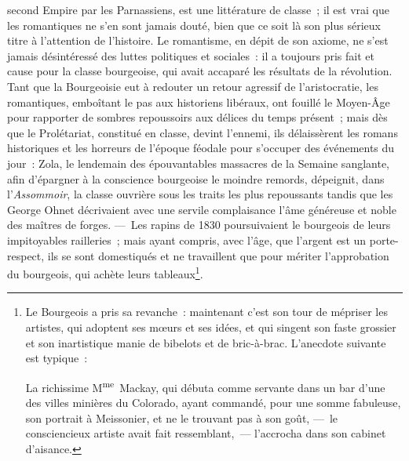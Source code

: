 \documentclass[french,twoside]{book} %
\begin{document}
\label{p605}second Empire par les Parnassiens, est une littérature de classe ; il est vrai que les romantiques ne s’en sont jamais douté, bien que ce soit là son plus sérieux titre à l’attention de l’histoire. Le romantisme, en dépit de son axiome, ne s’est jamais désintéressé des luttes politiques et sociales : il a toujours pris fait et cause pour la classe bourgeoise, qui avait accaparé les résultats de la révolution. Tant que la Bourgeoisie eut à redouter un retour agressif de l’aristocratie, les romantiques, emboîtant le pas aux historiens libéraux, ont fouillé le Moyen-Âge pour rapporter de sombres repoussoirs aux délices du temps présent ; mais dès que le Prolétariat, constitué en classe, devint l’ennemi, ils délaissèrent les romans historiques et les horreurs de l’époque féodale pour s’occuper des événements du jour : Zola, le lendemain des épouvantables massacres de la Semaine sanglante, afin d’épargner à la conscience bourgeoise le moindre remords, dépeignit, dans l’\emph{Assommoir}, la classe ouvrière sous les traits les plus repoussants tandis que les George Ohnet décrivaient avec une servile complaisance l’âme généreuse et noble des maîtres de forges. — Les rapins de 1830 poursuivaient le bourgeois de leurs impitoyables railleries ; mais ayant compris, avec l’âge, que l’argent est un porte-respect, ils se sont domestiqués et ne travaillent que pour mériter l’approbation du bourgeois, qui achète leurs tableaux\footnote{\noindent Le Bourgeois a pris sa revanche : maintenant c’est son tour de mépriser les artistes, qui adoptent ses mœurs et ses idées, et qui singent son faste grossier et son inartistique manie de bibelots et de bric-à-brac. L’anecdote suivante est typique :\par
La richissime M\textsuperscript{me} Mackay, qui débuta comme servante dans un bar d’une des villes minières du Colorado, ayant commandé, pour une somme fabuleuse, son portrait à Meissonier, et ne le trouvant pas à son goût, — le consciencieux artiste avait fait ressemblant, — l’accrocha dans son cabinet d’aisance.
}.\par
\end{document}
